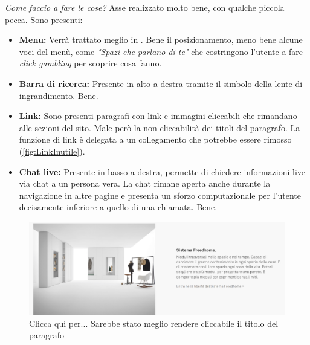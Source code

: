 \textit{Come faccio a fare le cose?}\newline
Asse realizzato molto bene, con qualche piccola pecca. Sono presenti:
\begin{itemize}
	\item \textbf{Menu:} Verrà trattato meglio in . Bene il posizionamento, meno bene alcune voci del menù, come \textit{"Spazi che parlano di te"} che costringono l'utente a fare \textit{click gambling} per scoprire cosa fanno.
	\item \textbf{Barra di ricerca:} Presente in alto a destra tramite il simbolo della lente di ingrandimento. Bene.
	\item \textbf{Link:} Sono presenti paragrafi con link e immagini cliccabili che rimandano alle sezioni del sito. Male però la non cliccabilità dei titoli del paragrafo. La funzione di link è delegata a un collegamento che potrebbe essere rimosso (\autoref{fig:LinkInutile}).
	\item \textbf{Chat live:} Presente in basso a destra, permette di chiedere informazioni live via chat a un persona vera. La chat rimane aperta anche durante la navigazione in altre pagine e presenta un sforzo computazionale per l'utente decisamente inferiore a quello di una chiamata. Bene.
\end{itemize}

\begin{figure}
	\centering
	\includegraphics[width=\textwidth]{sez/HomePage/img/Link.png}
	\caption[https://www.caccaro.com/]{Clicca qui per... Sarebbe stato meglio rendere cliccabile il titolo del paragrafo}
	\label{fig:LinkInutile}
\end{figure}